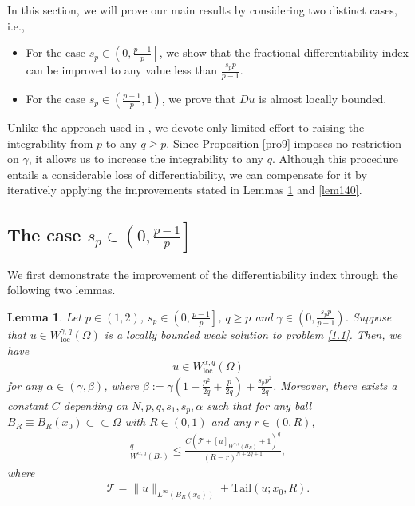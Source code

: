 \documentclass[reqno,10pt]{amsart}
\numberwithin{equation}{section}
\newtheorem{lemma}[theorem]{Lemma}
\begin{document}
In this section, we will prove our main results by considering two distinct cases, i.e.,  
\begin{itemize}
	\item [(i)] For the case $s_p\in \left(0,  \frac{p-1}{p}\right]$, we show that the fractional differentiability index can be improved to any value less than $\frac{s_p p}{p-1}$. 
	
	\item [(ii)] For the case $s_p\in \left( \frac{p-1}{p}, 1\right) $, we prove that $Du$ is almost locally bounded.
\end{itemize}
Unlike the approach used in \cite{LZ25}, we devote only limited effort to raising the integrability from $p$ to any $q\ge p$. Since Proposition \ref{pro9} imposes no restriction on $\gamma$, it allows us to increase the integrability to any $q$. Although this procedure entails a considerable loss of differentiability, we can compensate for it by iteratively applying the improvements stated in Lemmas \ref{lem11} and \ref{lem140}.

\subsection{The case $s_p\in \left( 0,\frac{p-1}{p}\right]$}
We first demonstrate the improvement of the differentiability index through the following two lemmas.
\begin{lemma}
	\label{lem11}
	Let $p\in(1, 2)$, $s_p\in\left( 0, \frac{p-1}{p}\right]$, $q\ge p$ and $\gamma\in \left( 0, \frac{s_p p}{p-1}\right)$. Suppose that $u\in W^{\gamma,q}_\mathrm{loc}(\Omega)$ is a locally bounded weak solution to problem \eqref{1.1}. Then, we have
	\begin{align*}
		u\in W^{\alpha,q}_{\mathrm{loc}}(\Omega)
	\end{align*}
	for any $\alpha\in (\gamma,\beta)$, where $\beta:=\gamma\left( 1-\frac{p^2}{2q}+\frac{p}{2q}\right)+\frac{s_pp^2}{2q}$.
	Moreover, there exists a constant $C$ depending on $N,p,q,s_1,s_p,\alpha$ such that for any ball $B_R\equiv B_R(x_0)\subset\subset\Omega$ with $R\in(0,1)$ and any $r\in(0,R)$,
	\begin{align*}
		[u]^q_{W^{\alpha,q}(B_r)}\le \frac{C\left( \mathcal{T}+[u]_{W^{\gamma,q}(B_R)}+1\right)^q }{(R-r)^{N+2q+1}},
	\end{align*}
	where
	\begin{align*}
		\mathcal{T}=\|u\|_{L^\infty(B_{R}(x_0))}+\mathrm{Tail}(u;x_0,R).
	\end{align*}
\end{lemma}
\end{document}
